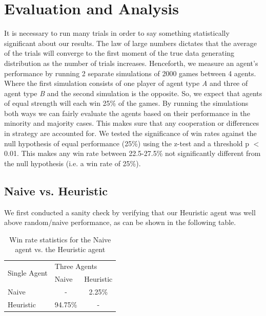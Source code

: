 \documentclass[msc, ai, twoside, notimes, logo, parskip, leftchapter, normalheadings]{infthesis}
\begin{document}
\chapter{Evaluation and Analysis}
It is necessary to run many trials in order to say something statistically significant about our results. The law of large numbers dictates that the average of the trials will converge to the first moment of the true data generating distribution as the number of trials increases. Henceforth, we measure an agent's performance by running 2 separate simulations of 2000 games between 4 agents. Where the first simulation consists of one player of agent type \textit{A} and three of agent type \textit{B} and the second simulation is the opposite. So, we expect that agents of equal strength will each win 25\% of the games. By running the simulations both ways we can fairly evaluate the agents based on their performance in the minority and majority cases. This makes sure that any cooperation or differences in strategy are accounted for. We tested the significance of win rates against the null hypothesis of equal performance (25\%) using the z-test and a threshold p \(<\) 0.01. This makes any win rate between 22.5-27.5\% not significantly different from the null hypothesis (i.e. a win rate of 25\%).

\section{Naive vs. Heuristic}
We first conducted a sanity check by verifying that our Heuristic agent was well above random/naive performance, as can be shown in the following table. 

\begin{table}[h!]
\centering
\caption{Win rate statistics for the Naive agent vs. the Heuristic agent}
\begin{tabular}{l|llll}
\multirow{2}{*}{Single Agent} & \multicolumn{4}{l}{Three Agents} \\ \cline{2-5} 
& \multicolumn{2}{l|}{Naive} & \multicolumn{2}{l}{Heuristic} \\ \hline \hline
Naive & \multicolumn{2}{c}{-} & \multicolumn{2}{c}{2.25\%} \\
Heuristic & \multicolumn{2}{c}{94.75\%} & \multicolumn{2}{c}{-} 
\end{tabular}
\end{table}
\end{document}
